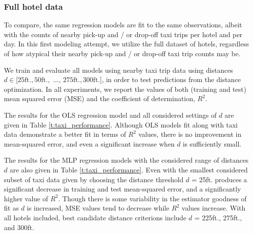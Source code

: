 \documentclass[useAMS, usenatbib]{biom}
\begin{document}
\subsubsection{Full hotel data}

To compare, the same regression models are fit to the same observations, albeit with the counts of nearby pick-up and / or drop-off taxi trips per hotel and per day. In this first modeling attempt, we utilize the full dataset of hotels, regardless of how atypical their nearby pick-up and / or drop-off taxi trip counts may be.

We train and evaluate all models using nearby taxi trip data using distances $d \in [25 \mathrm{ft.}, 50 \mathrm{ft.},$ ..., $275 \mathrm{ft.}, 300 \mathrm{ft.}]$, in order to test predictions from the distance optimization. In all experiments, we report the values of both (training and test) mean squared error (MSE) and the coefficient of determination, $R^2$.

The results for the OLS regression model and all considered settings of $d$ are given in Table \ref{t:taxi_performance}. Although OLS models fit along with taxi data demonstrate a better fit in terms of $R^2$ values, there is no improvement in mean-squared error, and even a significant increase when $d$ is sufficiently small.

The results for the MLP regression models with the considered range of distances $d$ are also given in Table \ref{t:taxi_performance}. Even with the smallest considered subset of taxi data given by choosing the distance threshold $d$ = 25ft. produces a significant decrease in training and test mean-squared error, and a significantly higher value of $R^2$. Though there is some variability in the estimator goodness of fit as $d$ is increased, MSE values tend to decrease while $R^2$ values increase. With all hotels included, best candidate distance criterions include $d$ = 225ft., 275ft., and 300ft.
\end{document}
